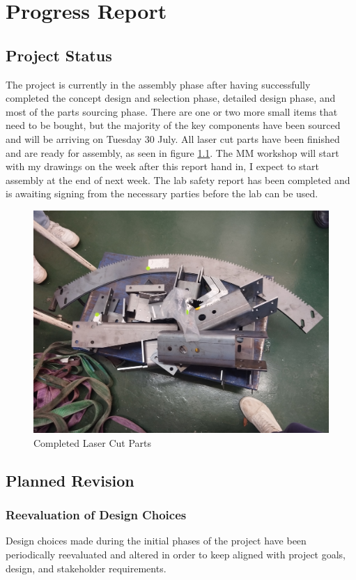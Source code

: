 \chapter{Progress Report}
\section{Project Status}
The project is currently in the assembly phase after having successfully completed the concept design and selection phase, detailed design phase, and most of the parts sourcing phase. There are one or two more small items that need to be bought, but the majority of the key components have been sourced and will be arriving on Tuesday 30 July. All laser cut parts have been finished and are ready for assembly, as seen in figure \ref{fig:laser_cut_parts}. The MM workshop will start with my drawings on the week after this report hand in, I expect to start assembly at the end of next week. The lab safety report has been completed and is awaiting signing from the necessary parties before the lab can be used.

\begin{figure}[H]
    \centering
    \includegraphics[width=0.75\linewidth]{figs/laser_cut_parts.jpg}
    \caption{Completed Laser Cut Parts}
    \label{fig:laser_cut_parts}
\end{figure}

\section{Planned Revision}
\subsection{Reevaluation of Design Choices}
Design choices made during the initial phases of the project have been periodically reevaluated and altered in order to keep aligned with project goals, design, and stakeholder requirements.
